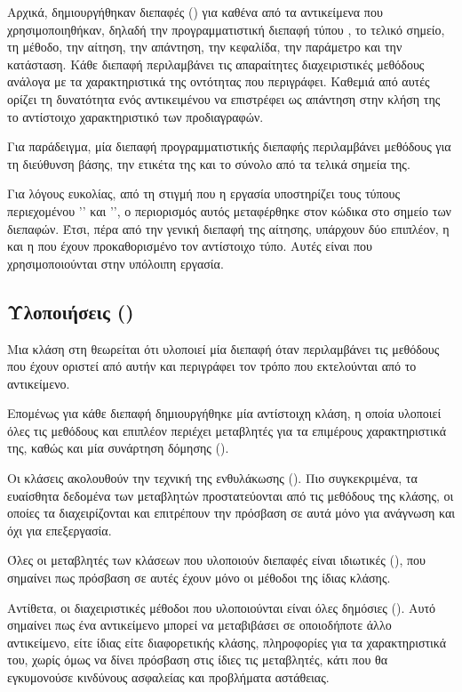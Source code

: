 Αρχικά, δημιουργήθηκαν διεπαφές () για καθένα από τα αντικείμενα που χρησιμοποιηθήκαν,
δηλαδή την προγραμματιστική διεπαφή τύπου ,
το τελικό σημείο,
τη μέθοδο,
την αίτηση,
την απάντηση,
την κεφαλίδα,
την παράμετρο
και την κατάσταση.
Κάθε διεπαφή περιλαμβάνει τις απαραίτητες διαχειριστικές μεθόδους ανάλογα με τα χαρακτηριστικά της οντότητας που περιγράφει.
Καθεμιά από αυτές ορίζει τη δυνατότητα ενός αντικειμένου να επιστρέφει ως απάντηση στην κλήση της
το αντίστοιχο χαρακτηριστικό των προδιαγραφών. 

Για παράδειγμα, μία διεπαφή προγραμματιστικής διεπαφής περιλαμβάνει μεθόδους για τη διεύθυνση βάσης,
την ετικέτα της
και το σύνολο από τα τελικά σημεία της.

Για λόγους ευκολίας,
από τη στιγμή που η εργασία υποστηρίζει τους τύπους περιεχομένου '' και '',
ο περιορισμός αυτός μεταφέρθηκε στον κώδικα στο σημείο των διεπαφών.
Έτσι, πέρα από την γενική διεπαφή της αίτησης,
υπάρχουν δύο επιπλέον,
η  και η  που έχουν προκαθορισμένο τον αντίστοιχο τύπο.
Αυτές είναι που χρησιμοποιούνται στην υπόλοιπη εργασία.

\subsection{Υλοποιήσεις ()}
Μια κλάση στη  θεωρείται ότι υλοποιεί μία διεπαφή όταν
περιλαμβάνει τις μεθόδους που έχουν οριστεί από αυτήν
και περιγράφει τον τρόπο που εκτελούνται από το αντικείμενο.

Επομένως για κάθε διεπαφή δημιουργήθηκε μία αντίστοιχη κλάση,
η οποία υλοποιεί όλες τις μεθόδους και επιπλέον
περιέχει μεταβλητές για τα επιμέρους χαρακτηριστικά της,
καθώς και μία συνάρτηση δόμησης (). 

Οι κλάσεις ακολουθούν την τεχνική της ενθυλάκωσης ().
Πιο συγκεκριμένα, τα ευαίσθητα δεδομένα των μεταβλητών προστατεύονται από
τις μεθόδους της κλάσης, οι οποίες τα διαχειρίζονται και 
επιτρέπουν την πρόσβαση σε αυτά μόνο για ανάγνωση και όχι για επεξεργασία. 

Όλες οι μεταβλητές των κλάσεων που υλοποιούν διεπαφές είναι ιδιωτικές (),
που σημαίνει πως πρόσβαση σε αυτές έχουν μόνο οι μέθοδοι της ίδιας κλάσης.

Αντίθετα, οι διαχειριστικές μέθοδοι που υλοποιούνται είναι όλες δημόσιες ().
Αυτό σημαίνει πως ένα αντικείμενο μπορεί να μεταβιβάσει σε οποιοδήποτε άλλο αντικείμενο,
είτε ίδιας είτε διαφορετικής κλάσης,
πληροφορίες για τα χαρακτηριστικά του,
χωρίς όμως να δίνει πρόσβαση στις ίδιες τις μεταβλητές,
κάτι που θα εγκυμονούσε κινδύνους ασφαλείας και προβλήματα αστάθειας.

